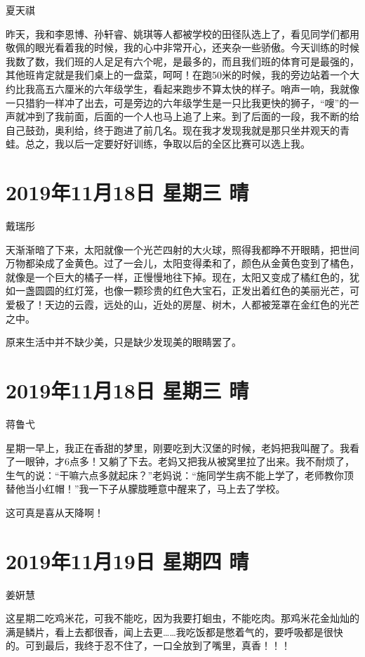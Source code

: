 夏天祺

昨天，我和李恩博、孙轩睿、姚琪等人都被学校的田径队选上了，看见同学们都用敬佩的眼光看着我的时候，我的心中非常开心，还夹杂一些骄傲。今天训练的时候我数了数，我们班的人足足有六个呢，是最多的，而且我们班的体育可是最强的，其他班肯定就是我们桌上的一盘菜，呵呵！在跑50米的时候，我的旁边站着一个大约比我高五六厘米的六年级学生，看起来跑步不算太快的样子。哨声一响，我就像一只猎豹一样冲了出去，可是旁边的六年级学生是一只比我更快的狮子，``嗖''的一声就冲到了我前面，后面的一个人也马上追了上来。到了后面的一段，我不断的给自己鼓劲，奥利给，终于跑进了前几名。现在我才发现我就是那只坐井观天的青蛙。总之，我以后一定要好好训练，争取以后的全区比赛可以选上我。

\section{2019年11月18日 星期三 晴}

戴瑞彤

天渐渐暗了下来，太阳就像一个光芒四射的大火球，照得我都睁不开眼睛，把世间万物都染成了金黄色。过了一会儿，太阳变得柔和了，颜色从金黄色变到了橘色，就像是一个巨大的橘子一样，正慢慢地往下掉。现在，太阳又变成了橘红色的，犹如一盏圆圆的红灯笼，也像一颗珍贵的红色大宝石，正发出着红色的美丽光芒，可爱极了！天边的云霞，远处的山，近处的房屋、树木，人都被笼罩在金红色的光芒之中。

原来生活中并不缺少美，只是缺少发现美的眼睛罢了。

\section{2019年11月18日 星期三 晴}

蒋鲁弋

星期一早上，我正在香甜的梦里，刚要吃到大汉堡的时候，老妈把我叫醒了。我看了一眼钟，才6点多！又躺了下去。老妈又把我从被窝里拉了出来。我不耐烦了，生气的说：``干嘛六点多就起床？''老妈说：``施同学生病不能上学了，老师教你顶替他当小红帽！''我一下子从朦胧睡意中醒来了，马上去了学校。

这可真是喜从天降啊！

\section{2019年11月19日 星期四 晴}

姜姸慧

这星期二吃鸡米花，可我不能吃，因为我要打蛔虫，不能吃肉。那鸡米花金灿灿的满是鳞片，看上去都很香，闻上去更\ldots\ldots 我吃饭都是憋着气的，要呼吸都是很快的。可到最后，我终于忍不住了，一口全放到了嘴里，真香！！！

